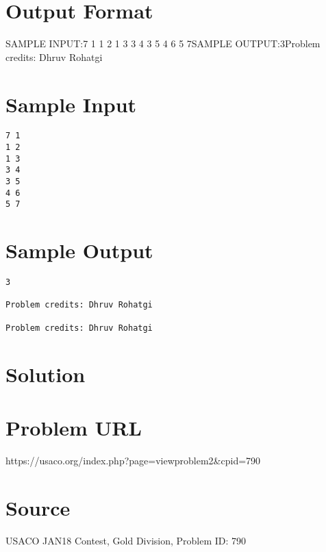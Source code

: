 \documentclass[12pt]{article}
\begin{document}
\section*{Output Format}
SAMPLE INPUT:7 1
1 2
1 3
3 4
3 5
4 6
5 7SAMPLE OUTPUT:3Problem credits: Dhruv Rohatgi

\section*{Sample Input}
\begin{verbatim}
7 1
1 2
1 3
3 4
3 5
4 6
5 7
\end{verbatim}

\section*{Sample Output}
\begin{verbatim}
3

Problem credits: Dhruv Rohatgi

Problem credits: Dhruv Rohatgi
\end{verbatim}

\section*{Solution}


\section*{Problem URL}
https://usaco.org/index.php?page=viewproblem2&cpid=790

\section*{Source}
USACO JAN18 Contest, Gold Division, Problem ID: 790
\end{document}

